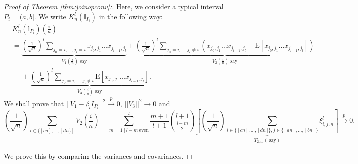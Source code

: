 \documentclass[reqno,12pt]{amsart}
\theoremstyle{plain}
\theoremstyle{definition}
\begin{document}
\begin{proof}[Proof of Theorem \ref{thm:joinopconv}:]
Here, we consider a typical interval $P_{i}=(a,b]$. We write $K_{n}^{l}(\mathbb{I}_{P_{i}})$ in the following way:
\begin{equation}
    \begin{split}
        & K_{n}^{l}(\mathbb{I}_{P_{i}})\left(  \frac{i}{n}\right)\\
        &= \underbrace{\left( \frac{1}{\sqrt{n}} \right)^{l} \sum_{j_{0}=i, \ldots , j_{l}=i } x_{j_{0},j_{1}} \ldots x_{j_{l-1},j_{l}}}_{V_{1}(\frac{i}{n})\text{ say}} + \underbrace{\left( \frac{1}{\sqrt{n}} \right)^{l} 
        \sum_{j_{0}=i,\ldots, j_{l}\neq i} \left(x_{j_{0},j_{1}}\ldots x_{j_{l-1},j_{l}} -\mathrm{E}\left[ x_{j_{0},j_{1}}\ldots x_{j_{l-1},j_{l}}\right]\right)}_{V_{2}(\frac{i}{n}) \text{ say}}\\
        &~~~~~~ + \underbrace{\left( \frac{1}{\sqrt{n}} \right)^{l} 
        \sum_{j_{0}=i,\ldots, j_{l}\neq i} \mathrm{E}\left[ x_{j_{0},j_{1}}\ldots x_{j_{l-1},j_{l}} \right]}_{V_{3}(\frac{i}{n}) \text{ say}}.
    \end{split}
\end{equation}
We shall prove that $||V_{1}- \beta_{l} I_{P_{i}}||^{2} \stackrel{p}{\to} 0$, $||V_{3}||^{2} \to 0$ and 
\begin{equation}\label{eq:traceapproximationnb}
\left( \frac{1}{\sqrt{n}} \right)\sum_{i\in\{ [cn],\ldots,[dn\}]} V_{2}\left( \frac{i}{n}\right)- \sum_{m=1~|~ l-m ~ \text{even}}^{l} \frac{m+1}{l+1}\binom{l+1}{\frac{l-m}{2}}\underbrace{\left[\left( \frac{1}{\sqrt{n}} \right)\sum_{i \in  \{ [cn],\ldots, [dn]\}, j \in \{ [an],\ldots, [bn]\}  } \xi^{l}_{i,j,n}\right]}_{T_{2,m} (\text{ say})} \stackrel{p}{\to} 0.
\end{equation}




    \noindent 
    We prove this by comparing the variances and covariances.


\end{proof}
\end{document}
